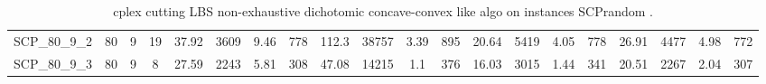 \begin{sidewaystable}[!ht]
{\begin{tabular}{lccccccccccccccccccc}
SCP\_80\_9\_2 & 80 & 9 & 19 & 37.92 & 3609 & 9.46 & 778 & 112.3 & 38757 &  \textcolor{blue2}{3.39} & 895 & 20.64 & 5419 & 4.05 & 778 & 26.91 & 4477 & 4.98 & 772 \\
SCP\_80\_9\_3 & 80 & 9 & 8 & 27.59 & 2243 & 5.81 & 308 & 47.08 & 14215 &  \textcolor{blue2}{1.1} & 376 & 16.03 & 3015 & 1.44 & 341 & 20.51 & 2267 & 2.04 & 307 \\
\bottomrule
\end{tabular}
}%
\caption{cplex cutting LBS non-exhaustive dichotomic concave-convex like algo on instances SCPrandom .}
\label{tab:table_lambda_limits_SCPrandom }
\end{sidewaystable}
